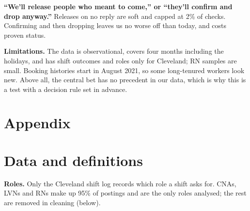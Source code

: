\documentclass[11pt]{article}
\begin{document}
\textbf{``We'll release people who meant to come,'' or ``they'll confirm and drop anyway.''} Releases on no reply are
soft and capped at 2\% of checks. Confirming and then dropping leaves us no worse off than today, and costs proven
status.

\textbf{Limitations.} The data is observational, covers four months including the holidays, and has shift outcomes and
roles only for Cleveland; RN samples are small. Booking histories start in August 2021, so some long-tenured workers look new. Above all, the central bet has no precedent in our data, which is why
this is a test with a decision rule set in advance.

\clearpage
\appendix
\renewcommand{\thesection}{\Alph{section}}
\renewcommand{\thefigure}{\Alph{section}\arabic{figure}}
\renewcommand{\thetable}{\Alph{section}\arabic{table}}
\section*{Appendix}

\section{Data and definitions}
\textbf{Roles.} Only the Cleveland shift log records which role a shift asks for. CNAs, LVNs and RNs make up 95\% of
postings and are the only roles analysed; the rest are removed in cleaning (below).
\end{document}

